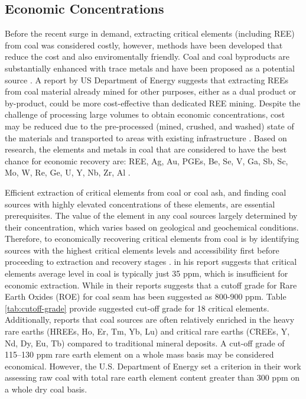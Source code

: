 \documentclass[11pt,a4paper,]{article}
\begin{document}
\hypertarget{economic-concentrations}{%
\subsection{Economic Concentrations}\label{economic-concentrations}}

Before the recent surge in demand, extracting critical elements (including REE) from coal was considered costly, however, methods have been developed that reduce the cost and also enviromentally friendly. Coal and coal byproducts are substantially enhanced with trace metals and have been proposed as a potential source \autocite{Eterigho2021}. A report by US Department of Energy suggests that extracting REEs from coal material already mined for other purposes, either as a dual product or by-product, could be more cost-effective than dedicated REE mining. Despite the challenge of processing large volumes to obtain economic concentrations, cost may be reduced due to the pre-processed (mined, crushed, and washed) state of the materials and transported to areas with existing infrastructure \autocite{usde2017,Hodgkinson2021}. Based on research, the elements and metals in coal that are considered to have the best chance for economic recovery are: REE, Ag, Au, PGEs, Be, Se, V, Ga, Sb, Sc, Mo, W, Re, Ge, U, Y, Nb, Zr, Al \autocite{DAI2018155}.

Efficient extraction of critical elements from coal or coal ash, and finding coal sources with highly elevated concentrations of these elements, are essential prerequisites. The value of the element in any coal sources largely determined by their concentration, which varies based on geological and geochemical conditions. Therefore, to economically recovering critical elements from coal is by identifying sources with the highest critical elements levels and accessibility first before proceeding to extraction and recovery stages \autocite{Eterigho2021}. \textcite{Reid2018} in his report suggests that critical elements average level in coal is typically just 35 ppm, which is insufficient for economic extraction. While \textcite{Seredin2012} in their reports suggests that a cutoff grade for Rare Earth Oxides (ROE) for coal seam has been suggested as 800-900 ppm. Table \ref{tab:cutoff-grade} provide suggested cut-off grade for 18 critical elements. Additionally, \textcite{TALAN2022107897} reports that coal sources are often relatively enriched in the heavy rare earths (HREEs, Ho, Er, Tm, Yb, Lu) and critical rare earths (CREEs, Y, Nd, Dy, Eu, Tb) compared to traditional mineral deposits. A cut-off grade of 115--130 ppm rare earth element on a whole mass basis may be considered economical. However, the U.S. Department of Energy set a criterion in their work assessing raw coal with total rare earth element content greater than 300 ppm on a whole dry coal basis.
\end{document}
